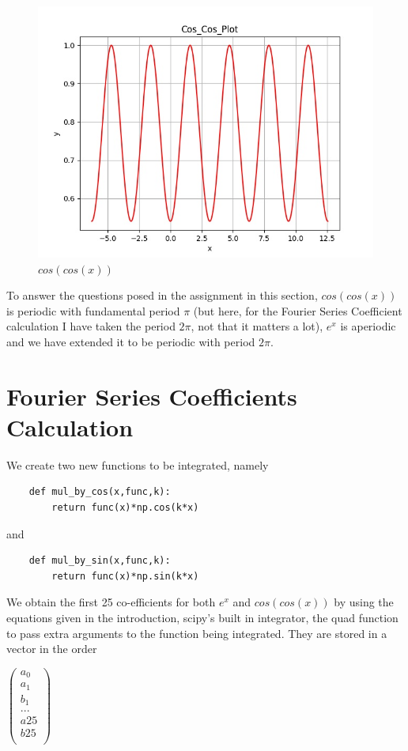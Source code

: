 \documentclass{article}
\begin{document}
\begin{figure}[!tbh]
    \centering
    \includegraphics[scale=0.65]{plots/Cos_Cos_Plot.jpg}
    \caption{$cos(cos(x))$}
    \label{fig:Figure 2}
    \end{figure}
    


\hfill \break

To answer the questions posed in the assignment in this section, $cos(cos(x))$ is periodic with fundamental period $\pi$ (but here, for the Fourier Series Coefficient calculation I have taken the period $2\pi$, not that it matters a lot), $e^x$ is aperiodic and we have extended it to be periodic with period $2\pi$.

\section{Fourier Series Coefficients Calculation}


\par We create two new functions to be integrated, namely \begin{verbatim}
    def mul_by_cos(x,func,k):
        return func(x)*np.cos(k*x)
\end{verbatim} and
\begin{verbatim}
    def mul_by_sin(x,func,k):
        return func(x)*np.sin(k*x)
\end{verbatim}
We obtain the first 25 co-efficients for both $e^x$ and $cos(cos(x))$ by using the equations given in the introduction, scipy’s built in integrator, the quad function to pass extra arguments to the function being integrated. They are stored in a vector in the order
\begin{center}
     $
    \begin{pmatrix}
    a_0\\
    a_1\\
    b_1\\
    ...\\
    a25\\
    b25\\
    \end{pmatrix}
     $
    
\end{center}
\end{document}
